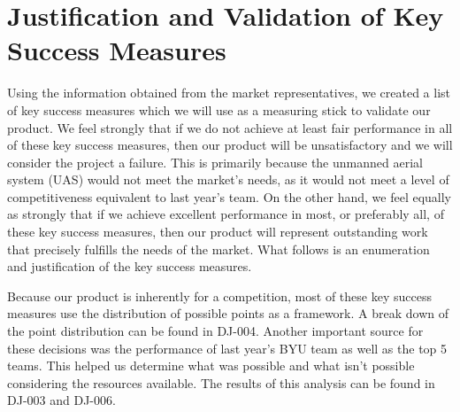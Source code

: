 \documentclass[]{auvsi_doc}
\begin{document}
\section{Justification and Validation of Key Success Measures}
Using the information obtained from the market representatives, we created a list of key success measures which we will use as a measuring stick to validate our product. We feel strongly that if we do not achieve at least fair performance in all of these key success measures, then our product will be unsatisfactory and we will consider the project a failure. This is primarily because the unmanned aerial system (UAS) would not meet the market's needs, as it would not meet a level of competitiveness equivalent to last year's team. On the other hand, we feel equally as strongly that if we achieve excellent performance in most, or preferably all, of these key success measures, then our product will represent outstanding work that precisely fulfills the needs of the market. What follows is an enumeration and justification of the key success measures. 

Because our product is inherently for a competition, most of these key success measures use the distribution of possible points as a framework. A break down of the point distribution can be found in DJ-004. Another important source for these decisions was the performance of last year's BYU team as well as the top 5 teams. This helped us determine what was possible and what isn't possible considering the resources available. The results of this analysis can be found in DJ-003 and DJ-006.
\end{document}

